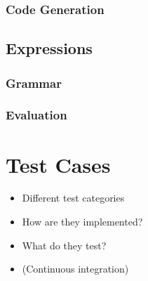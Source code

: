 \subsubsection{Code Generation}

\subsection{Expressions}
\subsubsection{Grammar}
\subsubsection{Evaluation}

\section{Test Cases}
\begin{itemize}
    \item Different test categories
    \item How are they implemented?
    \item What do they test?
    \item (Continuous integration) 
\end{itemize}